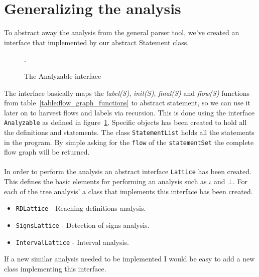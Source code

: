 \section{Generalizing the analysis}
To abstract away the analysis from the general parser tool, we've created an interface that implemented by our abstract Statement class.
\begin{figure}
\centering
{}
\caption{The Analyzable interface}
\label{fig:analysable_basic_definition}.
\end{figure}The interface basically maps the \textit{label(S)}, \textit{init(S)}, \textit{final(S)} and \textit{flow(S)} functions from table~\ref{table:flow_graph_functions} to abstract statement, so we can use it later on to harvest flows and labels via recursion. This is done using the interface \texttt{Analyzable} as defined in figure~\ref{fig:analysable_basic_definition}.
Specific objects has been created to hold all the definitions and statements. The class \texttt{StatementList} holds all the statements in the program. By simple asking for the \texttt{flow} of the \texttt{statementSet} the complete flow graph will be returned.
\\\\
In order to perform the analysis an abstract interface \texttt{Lattice} has been created. This defines the basic elements for performing an analysis such as $\iota$ and $\bot$. For each of the tree analysis' a class that implements this interface has been created.
\begin{itemize}
	\item \texttt{RDLattice} - Reaching definitions analysis.
	\item \texttt{SignsLattice} - Detection of signs analysis.
	\item \texttt{IntervalLattice} - Interval analysis.
\end{itemize}
If a new similar analysis needed to be implemented I would be easy to add a new class implementing this interface.

